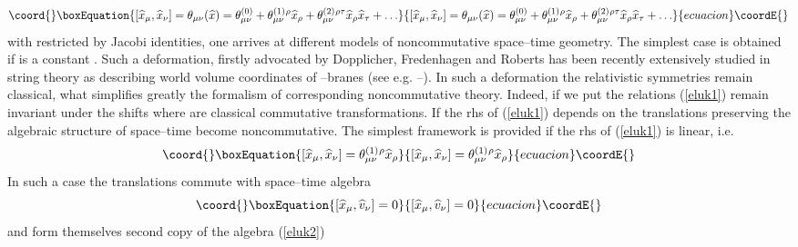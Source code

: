 \documentclass[a4paper,12pt]{article}
\begin{document}
\begin{equation}\coord{}\boxEquation{
\label{eluk1}
\left[  \widehat{x}_{\mu}, \widehat{x}_{\nu} \right]
= \theta_{\mu\nu} (\widehat{x} )
=   \theta_{\mu\nu}^{(0)}  +
\theta_{\mu\nu}^{(1)} {}^{\rho}\widehat{x}_{\rho}
+
\theta_{\mu\nu}^{(2)}  {}^{\rho\tau}\widehat{x}_{\rho}
\widehat{x}_{\tau} + \ldots
}{
\left[  \widehat{x}_{\mu}, \widehat{x}_{\nu} \right]
= \theta_{\mu\nu} (\widehat{x} )
=   \theta_{\mu\nu}^{(0)}  +
\theta_{\mu\nu}^{(1)} {}^{\rho}\widehat{x}_{\rho}
+
\theta_{\mu\nu}^{(2)}  {}^{\rho\tau}\widehat{x}_{\rho}
\widehat{x}_{\tau} + \ldots
}{ecuacion}\coordE{}\end{equation}
with \coordHE{} restricted by Jacobi  
identities, one
  arrives at different  models of noncommutative  space--time   
geometry. The
simplest case is obtained if
\coordHE{} is a constant
\coordHE{}. Such
 a deformation, firstly   advocated by Dopplicher, Fredenhagen and 
Roberts
  \cite{rluk1}  
  has been
  recently extensively studied  in string theory as
 describing world volume coordinates of
 \coordHE{}--branes (see e.g. \cite{rluk7}--\cite{rluk9}).
 In such a deformation the relativistic symmetries remain classical, 
what simplifies
greatly  the formalism of corresponding noncommutative theory. 
Indeed, if we
 put \coordHE{} the
 relations (\ref{eluk1}) remain invariant under the shifts
 \coordHE{} where 
\coordHE{} are
 classical commutative transformations. If the rhs of (\ref{eluk1})
 depends on \coordHE{} the translations preserving  the 
algebraic structure
 of space--time become noncommutative. The simplest framework 
is provided if the
 rhs of (\ref{eluk1}) is linear, i.e.
\begin{equation}\coord{}\boxEquation{
\label{eluk2}
\left[  \widehat{x}_{\mu}, \widehat{x}_{\nu} \right]
=
\theta_{\mu\nu}^{(1)}  {}^{\rho}\widehat{x}_{\rho}
}{
\left[  \widehat{x}_{\mu}, \widehat{x}_{\nu} \right]
=
\theta_{\mu\nu}^{(1)}  {}^{\rho}\widehat{x}_{\rho}
}{ecuacion}\coordE{}\end{equation}
In such a case the translations \coordHE{} commute with  space--time 
algebra
\begin{equation}\coord{}\boxEquation{
\label{eluk3} \left[  \widehat{x}_{\mu}, \widehat{v}_{\nu} \right]
= 0
}{
\left[  \widehat{x}_{\mu}, \widehat{v}_{\nu} \right]
= 0
}{ecuacion}\coordE{}\end{equation}
and form themselves second copy of the algebra (\ref{eluk2})
\end{document}
